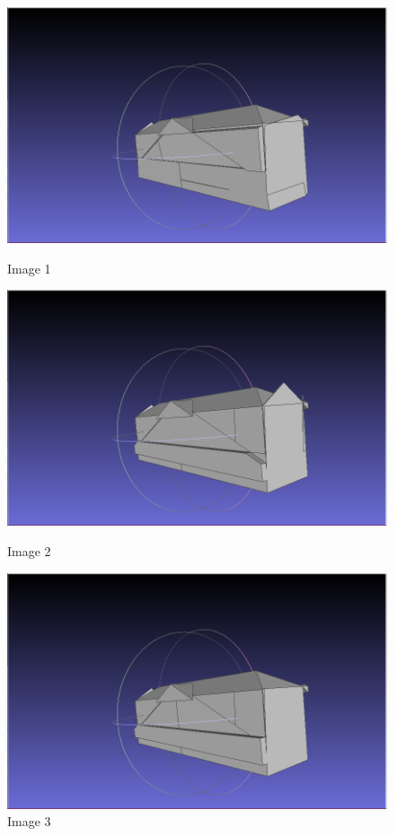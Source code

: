 \documentclass{article}
\begin{document}
\begin{figure}[h]
    \centering
    \begin{minipage}[b]{0.4\textwidth}
      \includegraphics[width=\textwidth]{../images/screen_kinetic/dist1_pmin220.png}
      \caption{Image 1}
      \label{fig:image1}
    \end{minipage}
    \hfill
    \begin{minipage}[b]{0.4\textwidth}
      \includegraphics[width=\textwidth]{../images/screen_kinetic/dist1_pmin250.png}
      \caption{Image 2}
      \label{fig:image2}
    \end{minipage}
    \hfill
    \begin{minipage}[b]{0.4\textwidth}
      \includegraphics[width=\textwidth]{../images/screen_kinetic/dist1_pmin280.png}
      \caption{Image 3}
      \label{fig:image3}
    \end{minipage}
  \end{figure}
  
  
\end{document}
